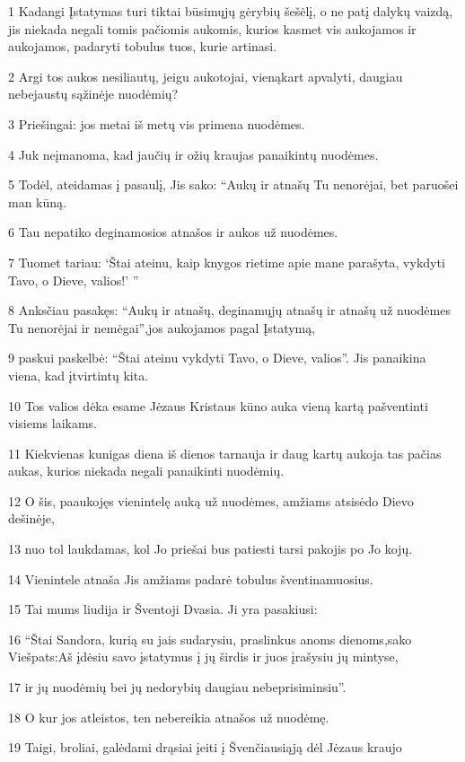\par 1 Kadangi Įstatymas turi tiktai būsimųjų gėrybių šešėlį, o ne patį dalykų vaizdą, jis niekada negali tomis pačiomis aukomis, kurios kasmet vis aukojamos ir aukojamos, padaryti tobulus tuos, kurie artinasi. 
\par 2 Argi tos aukos nesiliautų, jeigu aukotojai, vienąkart apvalyti, daugiau nebejaustų sąžinėje nuodėmių? 
\par 3 Priešingai: jos metai iš metų vis primena nuodėmes. 
\par 4 Juk neįmanoma, kad jaučių ir ožių kraujas panaikintų nuodėmes. 
\par 5 Todėl, ateidamas į pasaulį, Jis sako: “Aukų ir atnašų Tu nenorėjai, bet paruošei man kūną. 
\par 6 Tau nepatiko deginamosios atnašos ir aukos už nuodėmes. 
\par 7 Tuomet tariau: ‘Štai ateinu, kaip knygos rietime apie mane parašyta, vykdyti Tavo, o Dieve, valios!’ ” 
\par 8 Anksčiau pasakęs: “Aukų ir atnašų, deginamųjų atnašų ir atnašų už nuodėmes Tu nenorėjai ir nemėgai”,­jos aukojamos pagal Įstatymą,­ 
\par 9 paskui paskelbė: “Štai ateinu vykdyti Tavo, o Dieve, valios”. Jis panaikina viena, kad įtvirtintų kita. 
\par 10 Tos valios dėka esame Jėzaus Kristaus kūno auka vieną kartą pašventinti visiems laikams. 
\par 11 Kiekvienas kunigas diena iš dienos tarnauja ir daug kartų aukoja tas pačias aukas, kurios niekada negali panaikinti nuodėmių. 
\par 12 O šis, paaukojęs vienintelę auką už nuodėmes, amžiams atsisėdo Dievo dešinėje, 
\par 13 nuo tol laukdamas, kol Jo priešai bus patiesti tarsi pakojis po Jo kojų. 
\par 14 Vienintele atnaša Jis amžiams padarė tobulus šventinamuosius. 
\par 15 Tai mums liudija ir Šventoji Dvasia. Ji yra pasakiusi: 
\par 16 “Štai Sandora, kurią su jais sudarysiu, praslinkus anoms dienoms,­sako Viešpats:­Aš įdėsiu savo įstatymus į jų širdis ir juos įrašysiu jų mintyse, 
\par 17 ir jų nuodėmių bei jų nedorybių daugiau nebeprisiminsiu”. 
\par 18 O kur jos atleistos, ten nebereikia atnašos už nuodėmę. 
\par 19 Taigi, broliai, galėdami drąsiai įeiti į Švenčiausiąją dėl Jėzaus kraujo 
